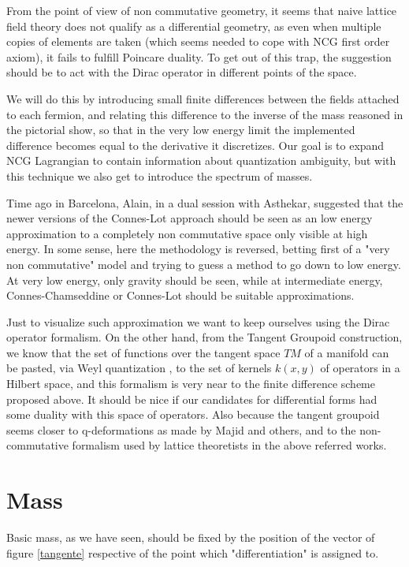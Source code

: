 \documentclass[a4paper]{article}
\begin{document}
From the point of view of non commutative geometry, it seems 
\cite{almostnogo} that naive lattice
field theory does not qualify as a differential geometry, as even when
multiple copies of elements are taken (which seems needed to cope with
NCG first order axiom), it fails to fulfill Poincare duality. To get out
of this trap, the suggestion should be to act with the Dirac
operator in different points of the space.
 
We will do this by introducing small finite differences
between the fields attached to each fermion, and relating this difference
to the inverse of the mass reasoned in the pictorial show,
 so that in the very low energy limit the
implemented difference becomes equal to the derivative it discretizes.
Our goal 
is to expand NCG Lagrangian to contain information about
quantization ambiguity, but with this technique we also get to introduce the
spectrum of masses. 

Time ago in Barcelona, Alain, in a dual session with Asthekar, suggested that
the newer versions \cite{reality, gravity} of the Connes-Lot approach 
should be seen as an low energy approximation to a completely
non commutative space only visible at high energy. In some sense, here
the methodology is reversed, betting first of a "very non
commutative" model and trying to guess a method to go down to
low energy. At very low energy, only gravity should be seen, while
at intermediate energy, Connes-Chamseddine or Connes-Lot should
be suitable approximations. 

Just to visualize such approximation we want to keep ourselves
using the Dirac operator formalism. On the other hand,
from the Tangent Groupoid construction, we know that the set of functions
over the tangent space $TM$ of a manifold can be pasted, via Weyl
quantization \cite{pepin, connes}, to the set of kernels
$k(x,y)$ of operators in a Hilbert space, and this formalism
is very near to the finite difference scheme proposed above. 
It should be nice if
 our candidates for differential
forms had some duality with this space of operators. Also because
the tangent groupoid seems closer to q-deformations as made
by Majid and others, and to the non-commutative formalism
used by lattice theoretists in the above referred works. 


\section{Mass}

Basic mass, as we have seen, should be fixed by the position of the vector
of figure \ref{tangente} respective of the point which "differentiation" is
assigned to.
\end{document}
